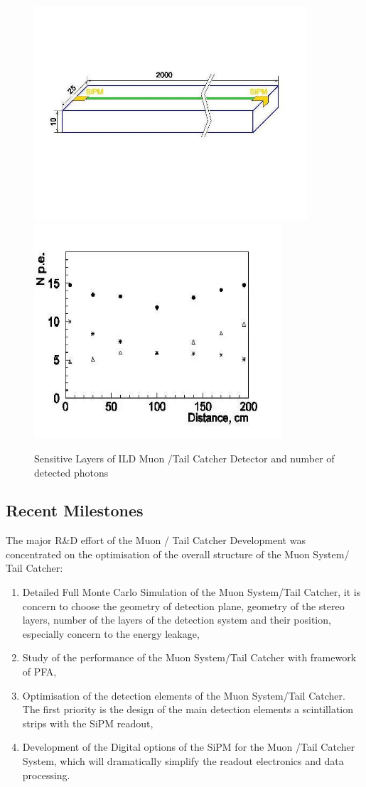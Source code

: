 \documentclass[12pt,twoside,a4paper]{book}
\begin{document}
\begin{figure}
	\centering
\includegraphics[height=8cm]{Sc_strip.jpg}
\includegraphics[height=8cm]{Sc_strip_photons.jpg}
	\caption{Sensitive Layers of ILD Muon /Tail Catcher Detector and number of detected photons}
	\label{ild:fig:muon:concept}
\end{figure}

\subsection{Recent Milestones}
The major R\&D effort of the Muon / Tail Catcher Development was concentrated on the optimisation of the overall structure of the Muon System/ Tail Catcher:
\begin{enumerate}
\item Detailed Full Monte Carlo Simulation of the Muon System/Tail Catcher, it is concern to choose the geometry of detection plane, geometry of the stereo layers, number of the layers of the detection system and their position, especially concern to the energy leakage,
\item Study of the performance of the Muon System/Tail Catcher with framework of PFA,
\item Optimisation of the detection elements of the Muon System/Tail Catcher. The first priority is the design of the main detection elements a scintillation strips with the SiPM readout,
\item Development of the Digital options of the SiPM for the Muon /Tail Catcher System, which will dramatically simplify the readout electronics and data processing.
\end{enumerate}
\end{document}
